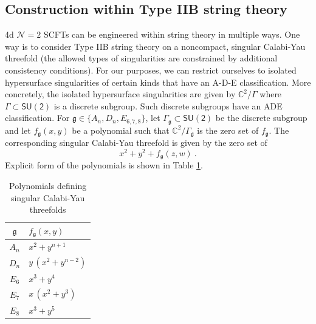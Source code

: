 \documentclass[a4paper,10pt]{article}
\newcommand{\C}{\mathds{C}}
\newcommand{\mr}[1]{\mathsf{#1}}
\newcommand{\tsf}[1]{\textsf{#1}}
\newcommand{\mf}[1]{\mathfrak{#1}}
\begin{document}
\subsection{Construction within Type \tsf{IIB} string theory} 
4d $\mathcal{N}=2$ \tsf{SCFT}s can be engineered within string theory in multiple ways. One way is to consider Type \tsf{IIB} string theory on a noncompact, singular Calabi-Yau threefold (the allowed types of singularities are constrained by additional consistency conditions). For our purposes, we can restrict ourselves to isolated hypersurface singularities of certain kinds that have an A-D-E classification. More concretely, the isolated hypersurface singularities are given by $\C^2/\Gamma$ where $\Gamma\subset \mr{SU(2)}$ is a discrete subgroup. Such discrete subgroups have an \tsf{ADE} classification. For $\mf{g}\in\{A_n,D_n,E_{6,7,8}\}$, let $\Gamma_\mf{g}\subset\mr{SU(2)}$ be the discrete subgroup and let $f_{\mf{g}}(x,y)$ be a polynomial such that  $\C^2/\Gamma_{\mf{g}}$ is the zero set of $f_{\mf{g}}$. The corresponding singular Calabi-Yau threefold is given by the zero set of 
\begin{equation}
x^2+y^2+f_{\mf{g}}(z,w)~.    
\end{equation}
Explicit form of the polynomials is shown in Table \ref{tab:pol_sing_CY}.
\begin{table}[]
\centering
\begin{tabular}{|c|l|}
\hline
\(\mathfrak{g}\) & \(f_{\mathfrak{g}}(x,y)\) \\
\hline
\(A_n\)   & \(x^2 + y^{n+1} \) \\
\hline
\(D_n\)   & \(y\,(x^2 + y^{n-2}) \) \\
\hline
\(E_6\)   & \(x^3 + y^4 \) \\
\hline
\(E_7\)   & \(x\,(x^2 + y^3) \) \\
\hline
\(E_8\)   & \(x^3 + y^5 \) \\
\hline
\end{tabular}
\caption{Polynomials defining singular Calabi-Yau threefolds}
\label{tab:pol_sing_CY}
\end{table}
\end{document}
